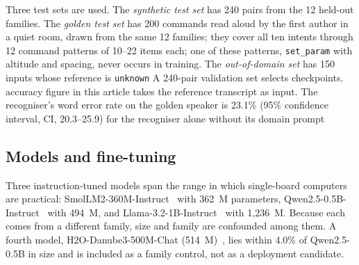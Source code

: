 \documentclass[a4paper,fleqn]{cas-dc}
\begin{document}
Three test sets are used. The \emph{synthetic test set} has 240 pairs from the 12 held-out
families. The \emph{golden test set} has 200 commands read aloud by the first author in a quiet room,
drawn from the same 12 families; they cover all ten intents through 12 command patterns of 10--22
items each; one of these patterns, \texttt{set\_param} with altitude and spacing, never occurs in training. The \emph{out-of-domain set} has 150 inputs whose reference is \texttt{unknown} A 240-pair validation set selects checkpoints.  accuracy figure in this
article takes the reference transcript as input. The recogniser's word error rate on the golden
speaker is 23.1\% (95\% confidence interval, CI, 20.3--25.9) for the recogniser alone without its domain prompt

\subsection{Models and fine-tuning}
\label{sec:models}

Three instruction-tuned models span the range in which single-board computers are practical:
SmolLM2-360M-Instruct~\citep{smollm2} with 362~M parameters, Qwen2.5-0.5B-Instruct~\citep{qwen25}
with 494~M, and Llama-3.2-1B-Instruct~\citep{llama32} with 1,236~M. Because each comes
from a different family, size and family are confounded among them. A fourth model,
H2O-Danube3-500M-Chat (514~M)~\citep{danube3}, lies within 4.0\% of Qwen2.5-0.5B in size and is
included as a family control, not as a deployment candidate.
\end{document}
